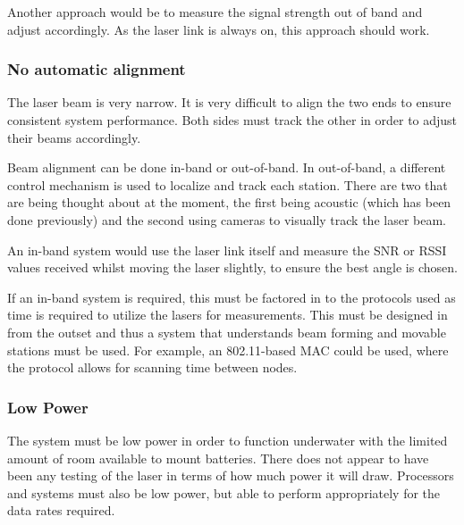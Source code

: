 Another approach would be to measure the signal strength out of band and
adjust accordingly. As the laser link is always on, this approach should work.

\subsubsection{No automatic alignment}
The laser beam is very narrow. It is very difficult to align the two ends
to ensure consistent system performance. Both sides must track the other in
order to adjust their beams accordingly.

Beam alignment can be done in-band or out-of-band. In out-of-band, a different
control mechanism is used to localize and track each station. There are two
that are being thought about at the moment, the first being acoustic (which
has been done previously) and the second using cameras to visually track the
laser beam.

An in-band system would use the laser link itself and measure the \ac{SNR} or
\ac{RSSI} values received whilst moving the laser slightly, to ensure the best
angle is chosen.

If an in-band system is required, this must be factored in to the protocols
used as time is required to utilize the lasers for measurements. This must
be designed in from the outset and thus a system that understands beam forming
and movable stations must be used. For example, an 802.11-based \ac{MAC} could
be used, where the protocol allows for scanning time between nodes.

\subsubsection{Low Power}
The system must be low power in order to function underwater with the limited
amount of room available to mount batteries. There does not appear to have been
any testing of the laser in terms of how much power it will draw. Processors
and systems must also be low power, but able to perform appropriately for
the data rates required.

